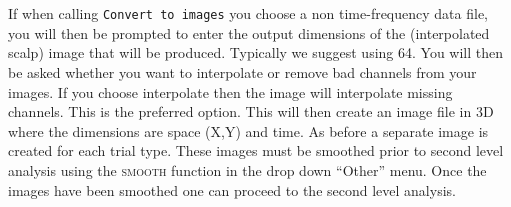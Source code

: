 \\
\\
If when calling \texttt{Convert to images} you choose a non time-frequency data file, you will then be prompted to enter the output dimensions of the (interpolated scalp) image that will be produced. Typically we suggest using 64. You will then be asked whether you want to interpolate or remove bad channels from your images. If you choose interpolate then the image will interpolate missing channels. This is the preferred option. This will then create an image file in 3D where the dimensions are space (X,Y) and time. As before a separate image is created for each trial type. These images must be smoothed prior to second level analysis using the \textsc{smooth} function in the drop down ``Other'' menu. Once the images have been smoothed one can proceed to the second level analysis.
